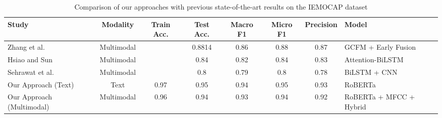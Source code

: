 \begin{table}[h]
\centering
\caption{Comparison of our approaches with previous state-of-the-art results on the IEMOCAP dataset}
\label{tab:sota_comparison}
\begin{tabular}{|l|c|c|c|c|c|c|l|}
\hline
\textbf{Study} & \textbf{Modality} & \textbf{Train Acc.} & \textbf{Test Acc.} & \textbf{Macro F1} & \textbf{Micro F1} & \textbf{Precision} & \textbf{Model} \\
\hline
Zhang et al. & Multimodal &  & 0.8814 & 0.86 & 0.88 & 0.87 & GCFM + Early Fusion \\
\hline
Hsiao and Sun & Multimodal &  & 0.84 & 0.82 & 0.84 & 0.83 & Attention-BiLSTM \\
\hline
Sehrawat et al. & Multimodal &  & 0.8 & 0.79 & 0.8 & 0.78 & BiLSTM + CNN \\
\hline
Our Approach (Text) & Text & 0.97 & 0.95 & 0.94 & 0.95 & 0.93 & RoBERTa \\
\hline
Our Approach (Multimodal) & Multimodal & 0.96 & 0.94 & 0.93 & 0.94 & 0.92 & RoBERTa + MFCC + Hybrid \\
\hline
\end{tabular}
\end{table}
